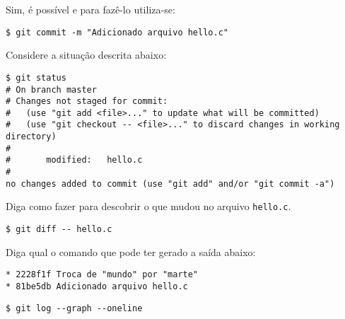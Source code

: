 \begin{Answer}[ref={0011}]
  Sim, é possível e para fazê-lo utiliza-se:
  \begin{lstlisting}
$ git commit -m "Adicionado arquivo hello.c"
  \end{lstlisting}
\end{Answer}
\begin{Exercise}[label={0012}, difficulty={1}, origin={git}]
  Considere a situação descrita abaixo:
  \begin{lstlisting}
$ git status
# On branch master
# Changes not staged for commit:
#   (use "git add <file>..." to update what will be committed)
#   (use "git checkout -- <file>..." to discard changes in working directory)
#
#       modified:   hello.c
#
no changes added to commit (use "git add" and/or "git commit -a")
  \end{lstlisting}
  Diga como fazer para descobrir o que mudou no arquivo \lstinline+hello.c+.
\end{Exercise}

\begin{Answer}[ref={0012}]
  \begin{lstlisting}
$ git diff -- hello.c
  \end{lstlisting}
\end{Answer}
\begin{Exercise}[label={0013}, difficulty={1}, origin={git}]
  Diga qual o comando que pode ter gerado a saída abaixo:
  \begin{lstlisting}
* 2228f1f Troca de "mundo" por "marte"
* 81be5db Adicionado arquivo hello.c
  \end{lstlisting}
\end{Exercise}

\begin{Answer}[ref={0013}]
  \begin{lstlisting}
$ git log --graph --oneline
  \end{lstlisting}
\end{Answer}
